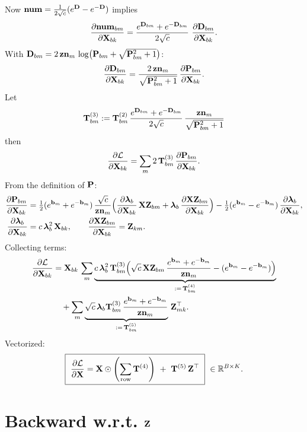 \documentclass{article}
\begin{document}
Now $\v{num}=\tfrac{1}{2\sqrt{c}}(\ev{D}-\ev{-D})$ implies
\begin{align}
\ddfrac{\v{num}{bm}}{\v{X}{bk}}
= \frac{\ev{D}{bm}+\ev{-D}{bm}}{2\sqrt{c}}\ \ddfrac{\v{D}{bm}}{\v{X}{bk}}.
\end{align}
With $\v{D}{bm}=2\,\v{zn}{m}\,\log\!\big(\v{P}{bm}+\sqrt{\v{P}{bm}^2+1}\big)$:
\begin{align}
\ddfrac{\v{D}{bm}}{\v{X}{bk}}
= \frac{2\,\v{zn}{m}}{\sqrt{\v{P}{bm}^2+1}}\,\ddfrac{\v{P}{bm}}{\v{X}{bk}}.
\end{align}
Let
\[
\T{3}{bm}:= \T{2}{bm}\,\frac{\ev{D}{bm}+\ev{-D}{bm}}{2\sqrt{c}}\,\frac{\v{zn}{m}}{\sqrt{\v{P}{bm}^2+1}}
\]
then
\begin{align}
\ddfrac{\mathcal{L}}{\v{X}{bk}}
= \sum_m 2\,\T{3}{bm}\,\ddfrac{\v{P}{bm}}{\v{X}{bk}}.
\end{align}
From the definition of $\v{P}$:
\begin{align}
\ddfrac{\v{P}{bm}}{\v{X}{bk}}
&= \tfrac12(\ev{b}{m}+\ev{-b}{m})\,\frac{\sqrt{c}}{\v{zn}{m}}
\Big(\ddfrac{\lam_b}{\v{X}{bk}}\,\v{XZ}{bm} + \lam_b\,\ddfrac{\v{XZ}{bm}}{\v{X}{bk}}\Big)
- \tfrac12(\ev{b}{m}-\ev{-b}{m})\,\ddfrac{\lam_b}{\v{X}{bk}},
\\
\ddfrac{\lam_b}{\v{X}{bk}} &= c\,\lam_b^2\,\v{X}{bk},\qquad
\ddfrac{\v{XZ}{bm}}{\v{X}{bk}} = \v{Z}{km}.
\end{align}
Collecting terms:
\begin{align}
\ddfrac{\mathcal{L}}{\v{X}{bk}}
&= \v{X}{bk}\,\sum_m \underbrace{c\,\lam_b^2\,\T{3}{bm}\Big(\sqrt{c}\,\v{XZ}{bm}\,\frac{\ev{b}{m}+\ev{-b}{m}}{\v{zn}{m}} - (\ev{b}{m}-\ev{-b}{m})\Big)}_{:=\,\T{4}{bm}} \\
&\quad + \sum_m \underbrace{\sqrt{c}\,\lam_b \T{3}{bm}\,\frac{\ev{b}{m}+\ev{-b}{m}}{\v{zn}{m}}}_{:=\,\T{5}{bm}}\,\v{Z}{mk}^{\top}.
\end{align}
Vectorized:
\[
\boxed{\ \ddfrac{\mathcal{L}}{\v{X}} = \v{X} \odot \rownorm{\T{4}}\ +\ \T{5}\,\v{Z}^{\top}\ }\ \in\mathbb{R}^{B\times K}.
\]

\section{Backward w.r.t. $\v{Z}$}
\end{document}
